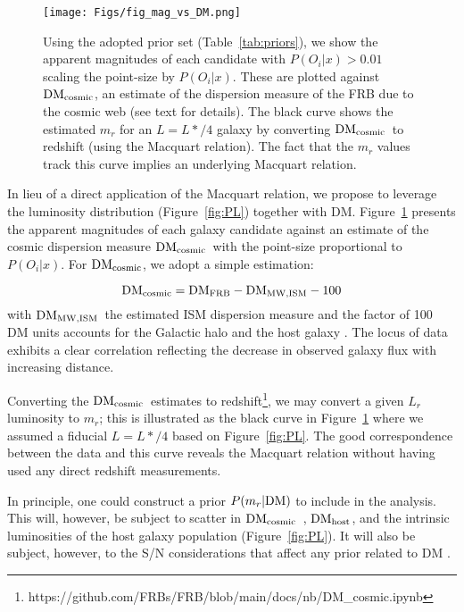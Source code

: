 \documentclass[twocolumn,linenumbers]{aastex63}
\newcommand{\mPOix}{P(O_i|x)}  %
\newcommand{\POix}{$\mPOix$}
\newcommand{\mdmcosmic}{{\rm DM}_{\rm cosmic}}
\newcommand{\dmcosmic}{$\mdmcosmic$}
\newcommand{\mdmfrb}{{\rm DM}_{\rm FRB}}
\newcommand{\mdmhost}{{\rm DM}_{\rm host}}
\newcommand{\dmhost}{$\mdmhost$}
\newcommand{\mdmmwism}{{\rm DM}_{\rm MW,ISM}}
\newcommand{\dmmwism}{$\mdmmwism$}
\begin{document}
\begin{figure*}[!ht]
\centering
    \texttt{[image: Figs/fig\_mag\_vs\_DM.png]}
    \caption{
    Using the adopted prior set (Table~\ref{tab:priors}), 
    we show the apparent magnitudes of each candidate
    with $\mPOix > 0.01$ scaling the point-size by \POix.  These are plotted
    against \dmcosmic, an estimate of the dispersion measure of the FRB
    due to the cosmic web (see text for details).
    The black curve shows the estimated $m_r$ for an
    $L = L*/4$ galaxy by converting \dmcosmic\ to redshift
    (using the Macquart relation).  
    The fact that the $m_r$ values track this curve
    implies an underlying Macquart relation.
    }
	\label{fig:mag_DM}
\end{figure*}

In lieu of a direct application of the Macquart relation,
we propose to leverage the luminosity distribution
(Figure~\ref{fig:PL}) together with DM.
Figure~\ref{fig:mag_DM} presents the apparent magnitudes of 
each galaxy candidate against an estimate of the cosmic 
dispersion measure \dmcosmic\ with the 
point-size proportional to \POix.
For \dmcosmic, we adopt a simple estimation: 

\begin{equation}
    \mdmcosmic = \mdmfrb - \mdmmwism - 100 
\end{equation}
with  \dmmwism\ the estimated ISM dispersion measure \citep{ne2001}
and the factor of 100 DM units accounts for the Galactic
halo and the host galaxy \citep[see][]{xyz19,Macquart20}.
The locus of data exhibits a clear correlation reflecting the
decrease in observed galaxy flux with increasing distance.


Converting the \dmcosmic\ estimates to 
redshift\footnote{https://github.com/FRBs/FRB/blob/main/docs/nb/DM\_cosmic.ipynb},
we may convert a given $L_r$ luminosity to $m_r$;
this is illustrated as the black curve in Figure~\ref{fig:mag_DM}
where we assumed a fiducial $L = L*/4$
based on Figure~\ref{fig:PL}.
The good correspondence between the data and this curve
reveals the Macquart relation without having used 
any direct redshift measurements.

In principle, one could construct a prior 
$P(m_r|{\rm DM})$ to include in the analysis.
This will, however, be subject to scatter in 
\dmcosmic\ \citep{Macquart20}, \dmhost, 
and the intrinsic luminosities of the host galaxy
population (Figure~\ref{fig:PL}).
It will also be subject, however, to the S/N
considerations that affect any prior related to DM
\citep{James20}.
\end{document}
